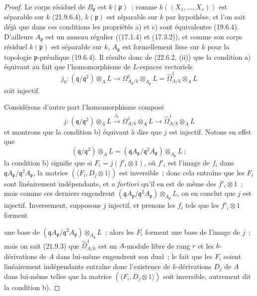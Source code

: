 \begin{proof}
Le corps résiduel de $B_{\mathfrak p}$ est $k(\mathfrak p)$~; comme
$k((X_1,\ldots,X_s))$ est séparable sur $k$ (21.9.6.4), $k(\mathfrak p)$ est
séparable sur $k$ par hypothèse, et l'on sait déjà que dans ces conditions les
propriétés a) et c) sont équivalentes (19.6.4). D'ailleurs
$A_{\mathfrak p}$ est un anneau régulier ((17.1.4) et (17.3.2)), et comme son
corps résiduel $k(\mathfrak p)$ est séparable sur $k$, $A_{\mathfrak p}$ est
formellement lisse sur $k$ pour la topologie $\mathfrak p$-préadique
(19.6.4). Il résulte donc de (22.6.2, (ii)) que la condition a) équivaut au
fait que l'homomorphisme de $L$-espaces vectoriels
\begin{equation}
\label{0.22.7.2.1-fr}
  j_0:(\mathfrak q/\mathfrak q^2)\otimes_AL
  \longrightarrow\Omega^1_{A_{\mathfrak p}/k}\otimes_{A_{\mathfrak p}}L
  =\widehat\Omega^1_{A/k}\otimes_AL
  \tag{22.7.2.1}
\end{equation}
soit injectif.

Considérons d'autre part l'homomorphisme composé
\begin{equation}
\label{0.22.7.2.2-fr}
  j:(\mathfrak q/\mathfrak q^2)\otimes_AL
  \xrightarrow{j_0}\Omega^1_{A/k}\otimes_AL
  \longrightarrow\widehat\Omega^1_{A/k}\otimes_AL
  \tag{22.7.2.2}
\end{equation}
et montrons que la condition b) équivaut à dire que $j$ est injectif. Notons en
effet que
\[
  (\mathfrak q/\mathfrak q^2)\otimes_AL
  =(\mathfrak qA_{\mathfrak p}/\mathfrak q^2A_{\mathfrak p})
  \otimes_{A_{\mathfrak p}}L~;
\]
la condition b) signifie que si $F_i=j(f'_i\otimes1)$, où $f'_i$ est l'image
de $f_i$ dans
$\mathfrak qA_{\mathfrak p}/\mathfrak q^2A_{\mathfrak p}$, la matrice
$(\langle F_i,D_j\otimes1\rangle)$ est inversible~; donc cela entraîne que les
$F_i$ sont linéairement indépendants, et \emph{a fortiori} qu'il en est de
même des $f'_i\otimes1$~; mais comme ces derniers engendrent
$(\mathfrak qA_{\mathfrak p}/\mathfrak q^2A_{\mathfrak p})
\otimes_{A_{\mathfrak p}}L$, on en conclut que $j$ est injectif. Inversement,
supposons $j$ injectif, et prenons les $f_i$ tels que les $f'_i\otimes1$
forment


une base de
$(\mathfrak qA_{\mathfrak p}/\mathfrak q^2A_{\mathfrak p})
\otimes_{A_{\mathfrak p}}L$~; alors les $F_i$ forment une base de l'image de
$j$~; mais on sait (21.9.3) que $\widehat\Omega^1_{A/k}$ est un $A$-module
libre de rang $r$ et les $k$-dérivations de $A$ dans lui-même engendrent son
dual~; le fait que les $F_i$ soient linéairement indépendants entraîne donc
l'existence de $k$-dérivations $D_j$ de $A$ dans lui-même telles que la matrice
$(\langle F_i,D_j\otimes1\rangle)$ soit inversible, autrement dit la condition
b).


\end{proof}
